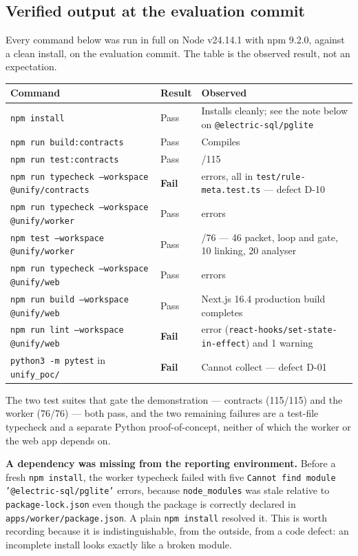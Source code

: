 \subsection{Verified output at the evaluation commit}

Every command below was run in full on Node v24.14.1 with npm 9.2.0, against a
clean install, on the evaluation commit. The table is the observed result, not
an expectation.

\begin{longtable}{>{\raggedright\arraybackslash}p{}>{\raggedright\arraybackslash}p{}>{\raggedright\arraybackslash}p{}}
\toprule
\textbf{Command} & \textbf{Result} & \textbf{Observed} \\
\midrule
\endhead
\texttt{npm install} & Pass & Installs cleanly; see the note below on
  \texttt{@electric-sql/pglite} \\
\texttt{npm run build:contracts} & Pass & Compiles \\
\texttt{npm run test:contracts} & Pass & 115/115 \\
\texttt{npm run typecheck --workspace @unify/contracts} & \textbf{Fail} &
  6 errors, all in \texttt{test/rule-meta.test.ts} --- defect D-10 \\
\texttt{npm run typecheck --workspace @unify/worker} & Pass & 0 errors \\
\texttt{npm test --workspace @unify/worker} & Pass & 76/76 --- 46 packet,
  loop and gate, 10 linking, 20 analyser \\
\texttt{npm run typecheck --workspace @unify/web} & Pass & 0 errors \\
\texttt{npm run build --workspace @unify/web} & Pass & Next.js 16.4 production
  build completes \\
\texttt{npm run lint --workspace @unify/web} & \textbf{Fail} & 1 error
  (\texttt{react-hooks/set-state-in-effect}) and 1 warning \\
\texttt{python3 -m pytest} in \texttt{unify\_poc/} & \textbf{Fail} & Cannot
  collect --- defect D-01 \\
\bottomrule
\end{longtable}

\noindent The two test suites that gate the demonstration --- contracts
(115/115) and the worker (76/76) --- both pass, and the two remaining failures
are a test-file typecheck and a separate Python proof-of-concept, neither of
which the worker or the web app depends on.

\medskip\noindent\textbf{A dependency was missing from the reporting
environment.} Before a fresh \texttt{npm install}, the worker typecheck failed
with five \texttt{Cannot find module '@electric-sql/pglite'} errors, because
\texttt{node\_modules} was stale relative to \texttt{package-lock.json} even
though the package is correctly declared in
\texttt{apps/worker/package.json}. A plain \texttt{npm install} resolved it.
This is worth recording because it is indistinguishable, from the outside, from
a code defect: an incomplete install looks exactly like a broken module.

